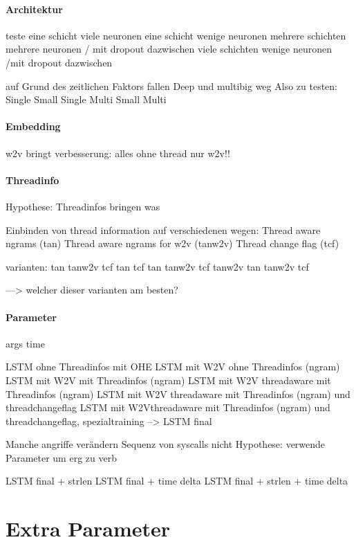         \paragraph{Architektur}
            teste eine schicht viele neuronen 
            eine schicht wenige neuronen
            mehrere schichten mehrere neuronen / mit dropout dazwischen
            viele schichten wenige neuronen /mit dropout dazwischen

            auf Grund des zeitlichen Faktors fallen Deep und multibig weg
            Also zu testen:
            Single Small
            Single 
            Multi Small
            Multi 

        \paragraph{Embedding}

            w2v bringt verbesserung:
            alles ohne thread nur w2v!!

        \paragraph{Threadinfo}
            Hypothese:
            Threadinfos bringen was

            Einbinden von thread information auf verschiedenen wegen:
            Thread aware ngrams (tan)
            Thread aware ngrams for w2v (tanw2v)
            Thread change flag (tcf)

            varianten:
            tan
            tanw2v
            tcf
            tan tcf
            tan tanw2v
            tcf tanw2v
            tan tanw2v tcf

            ---> welcher dieser varianten am besten?

        \paragraph{Parameter}
            args
            time

            LSTM ohne Threadinfos mit OHE
            LSTM mit W2V ohne Threadinfos (ngram)
            LSTM mit W2V mit Threadinfos (ngram)
            LSTM mit W2V threadaware mit Threadinfos (ngram)
            LSTM mit W2V threadaware mit Threadinfos (ngram) und threadchangeflag
            LSTM mit W2Vthreadaware mit Threadinfos (ngram) und threadchangeflag, spezialtraining
            --> LSTM final

            Manche angriffe verändern Sequenz von syscalls nicht
            Hypothese:
            verwende Parameter um erg zu verb

            LSTM final + strlen
            LSTM final + time delta
            LSTM final + strlen + time delta


\section{Extra Parameter}

